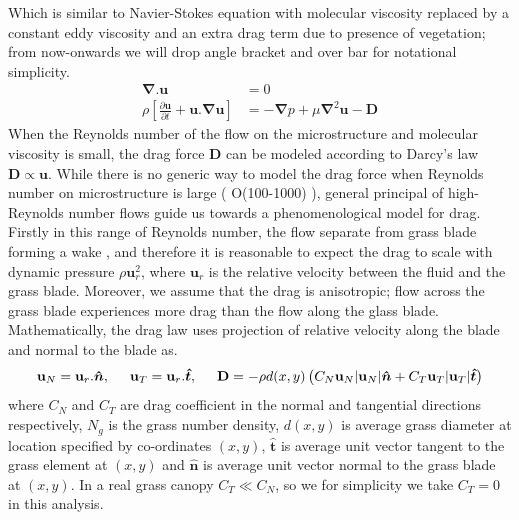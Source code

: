 \documentclass[12pt]{report}   %
\newcommand{\bn}{{\boldsymbol{\hat{n}}}}
\newcommand{\bt}{{\boldsymbol{\hat{t}}}}
\newcommand{\bu}{\mathbf{u}}
\newcommand{\grad}{\mathbf{\nabla}}
\begin{document}
Which is similar to Navier-Stokes equation with molecular viscosity replaced by a constant eddy viscosity and an extra drag term due to presence of vegetation; from now-onwards we will drop angle bracket and over bar for notational simplicity.
\begin{equation}\label{averaged_eq}
\begin{split}
  \grad .{\bu}&=0 \\
 \rho \left[ \frac{\partial {\bu}  }{\partial t}+  {\bu} . \grad \bu  \right ] &= - \grad{p}  +\mu \grad^2\bu - \mathbf{D}
\end{split}
\end{equation}
When the Reynolds number of the flow on the microstructure and molecular viscosity is small, the drag force $\mathbf{D}$ can be modeled according to Darcy's law $\mathbf{D} \propto \bu$. While there is no generic way to model the drag force when Reynolds number on microstructure is large ( O(100-1000) ), general principal of high-Reynolds number flows guide us towards a phenomenological model for drag. Firstly in this range of Reynolds number, the flow separate from grass blade forming a wake , and therefore it is reasonable to expect the drag to scale with dynamic pressure $\rho \bu_r^2$, where $\bu_r$ is the relative velocity between the fluid and the grass blade. Moreover, we assume that the drag is anisotropic; flow across the grass blade experiences more drag than the flow along the glass blade. Mathematically, the drag law uses projection of relative velocity along the blade and normal to the blade as.
\begin{equation}
 \bu_N = \bu_r.\bn,\hspace{0.5cm} \bu_T = \bu_r.\bt,\hspace{.5cm} \mathbf{D} = -\rho d(x,y)\left( C_N \bu_N |\bu_N|\bn + C_T \bu_T |\bu_T| \bt \right)
\end{equation} 
where $C_N$ and $C_T$ are drag coefficient in the normal and tangential directions respectively, $N_g$ is the grass number density, $d(x,y)$ is average grass diameter at location specified by co-ordinates $(x,y)$, $\bt$ is average unit vector tangent to the grass element at $(x,y)$ and $\bn$ is average unit vector normal to the grass blade at $(x,y)$. In a real grass canopy $C_T \ll C_N$, so we for simplicity we take $C_T=0$ in this analysis.
\end{document}
